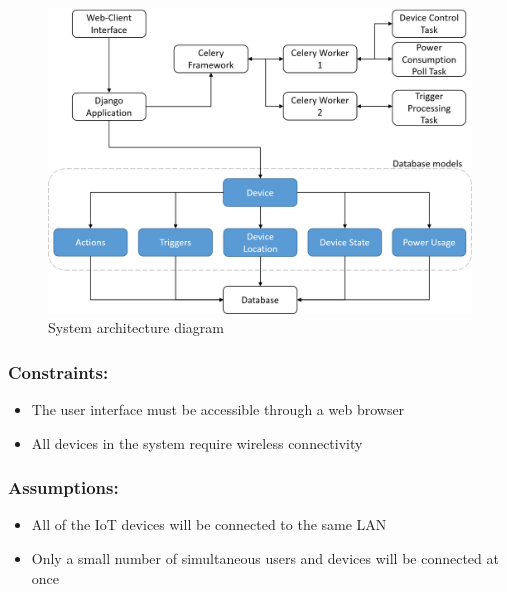 \documentclass[10pt,twocolumn]{witseiepaper}
\begin{document}
	\begin{figure}[H]
		\centering
		\includegraphics[width=\linewidth]{Sys_Overview}
		\caption{System architecture diagram}
		\label{fig:Sys_Overview}
	\end{figure}
	
	\subsubsection{Constraints:}
	\begin{itemize}
		\item The user interface must be accessible through a web browser
		\item All devices in the system require wireless connectivity
	\end{itemize}
	
	\subsubsection{Assumptions:}
	\begin{itemize}
		\item All of the IoT devices will be connected to the same LAN
		\item Only a small number of simultaneous users and devices will be connected at once
	\end{itemize}
	
\end{document}
